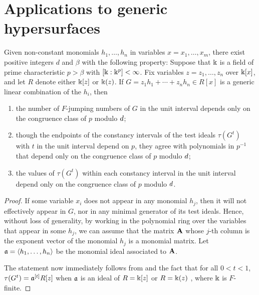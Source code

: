 \documentclass{amsart}
\begin{document}
\section{Applications to generic hypersurfaces}
\label{generic-hypersurfaces: S}


\begin{theorem}
	\label{generic-test-ideals-main: T}
Given non-constant monomials $h_1, \ldots, h_n$ in variables $x = x_1, \ldots, x_m$, there exist positive integers $d$ and $\beta$ with the following property\textup:  
Suppose that $\Bbbk$ is a field of prime characteristic $p > \beta$ with $[\Bbbk:\Bbbk^p] < \infty$.  
Fix variables $z = z_1, \ldots, z_n$ over $\Bbbk[x]$, and let $R$ denote either $\Bbbk[z]$ or $\Bbbk(z)$. 
If $G = z_1 h_1 + \cdots + z_n h_n \in R[x]$ is a generic linear combination of the $h_i$, then
\begin{enumerate}[$(1)$]
		\item the number of $F$-jumping numbers of $G$ in the unit interval depends only on the congruence class of $p$ modulo $d$\textup;
		\item though the endpoints of the constancy intervals of the test ideals $\tau(G^t)$ with $t$ in the unit interval 
		depend on $p$, they agree with polynomials in $p^{-1}$ that depend only on the congruence class of $p$ modulo $d$\textup;
		\item the values of $\tau(G^t)$ within each constancy interval in the unit interval depend only on the congruence class of $p$ modulo $d$.
	\end{enumerate}	
\end{theorem}

\begin{proof}
If some variable $x_i$ does not appear in any monomial $h_j$, then it will not effectively appear in $G$, nor in  any minimal generator of its test ideals.  
Hence, without loss of generality, by working in the polynomial ring over the variables that appear in some $h_j$, we can assume that the matrix $\mathbf{A}$ whose $j$-th column is the exponent vector of the monomial $h_j$ 
is a monomial matrix.  Let $\mathfrak{a} = \langle h_1, \ldots, h_n \rangle$ be the monomial ideal associated to $\mathbf{A}$.

The statement now immediately follows from   and 
the fact that for all $0 < t < 1$, $\tau(G^t) = \mathfrak{a}^{[t]} R[z]$ when $\mathfrak{a}$ is an ideal of 
$R = \Bbbk[z]$
\cite[Theorem 5.3]{hernandez+etal.frobenius_powers} or $R = \Bbbk(z)$ \cite[Corollary 5.7]{hernandez+etal.frobenius_powers}, where $\Bbbk$ is $F$-finite. 
\end{proof}	
	
\end{document}
